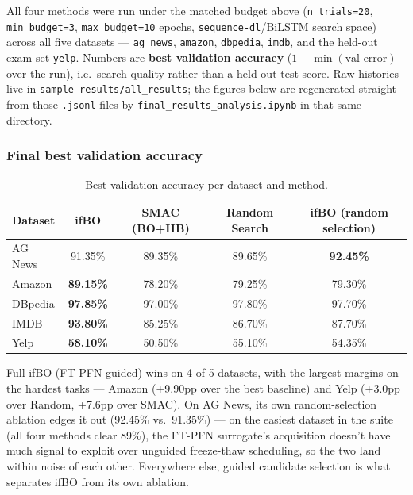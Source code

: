 \documentclass[10pt]{article}
\begin{document}
All four methods were run under the matched budget above (\texttt{n\_trials=20},
\texttt{min\_budget=3}, \texttt{max\_budget=10} epochs, \texttt{sequence-dl}/BiLSTM search space)
across all five datasets --- \texttt{ag\_news}, \texttt{amazon}, \texttt{dbpedia}, \texttt{imdb}, and the
held-out exam set \texttt{yelp}. Numbers are \textbf{best validation accuracy}
($1 - \min(\text{val\_error})$ over the run), i.e.\ search quality rather than a held-out test
score. Raw histories live in \texttt{sample-results/all\_results}; the figures below are
regenerated straight from those \texttt{.jsonl} files by
\texttt{final\_results\_analysis.ipynb} in that same directory.

\subsubsection*{Final best validation accuracy}

\begin{table}[H]
\centering
\begin{tabular}{@{}lcccc@{}}
\toprule
\textbf{Dataset} & \textbf{ifBO} & \textbf{SMAC (BO+HB)} & \textbf{Random Search} & \textbf{ifBO (random selection)} \\
\midrule
AG News  & 91.35\% & 89.35\% & 89.65\% & \textbf{92.45\%} \\
Amazon   & \textbf{89.15\%} & 78.20\% & 79.25\% & 79.30\% \\
DBpedia  & \textbf{97.85\%} & 97.00\% & 97.80\% & 97.70\% \\
IMDB     & \textbf{93.80\%} & 85.25\% & 86.70\% & 87.70\% \\
Yelp     & \textbf{58.10\%} & 50.50\% & 55.10\% & 54.35\% \\
\bottomrule
\end{tabular}
\caption{Best validation accuracy per dataset and method.}
\end{table}

Full ifBO (FT-PFN-guided) wins on 4 of 5 datasets, with the largest margins on the hardest
tasks --- Amazon (+9.90pp over the best baseline) and Yelp (+3.0pp over Random, +7.6pp over
SMAC). On AG News, its own random-selection ablation edges it out (92.45\% vs.\ 91.35\%) --- on
the easiest dataset in the suite (all four methods clear 89\%), the FT-PFN surrogate's
acquisition doesn't have much signal to exploit over unguided freeze-thaw scheduling, so the two
land within noise of each other. Everywhere else, guided candidate selection is what separates
ifBO from its own ablation.
\end{document}
